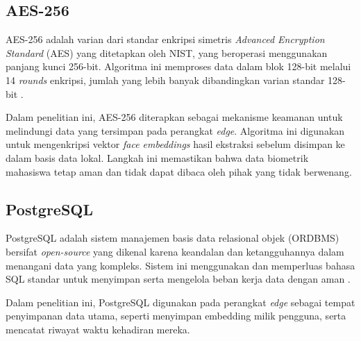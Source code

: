 \subsection{AES-256}
\label{subsec:aes256-teori}

AES-256 adalah varian dari standar enkripsi simetris \textit{Advanced Encryption Standard} (AES) yang ditetapkan oleh NIST, yang beroperasi menggunakan panjang kunci 256-bit. Algoritma ini memproses data dalam blok 128-bit melalui 14 \textit{rounds} enkripsi, jumlah yang lebih banyak dibandingkan varian standar 128-bit \parencite{Gonzalez2023}.

Dalam penelitian ini, AES-256 diterapkan sebagai mekanisme keamanan untuk melindungi data yang tersimpan pada perangkat \textit{edge}. Algoritma ini digunakan untuk mengenkripsi vektor \textit{face embeddings} hasil ekstraksi sebelum disimpan ke dalam basis data lokal. Langkah ini memastikan bahwa data biometrik mahasiswa tetap aman dan tidak dapat dibaca oleh pihak yang tidak berwenang.

\subsection{PostgreSQL}
\label{subsec:postgresql-teori}

PostgreSQL adalah sistem manajemen basis data relasional objek (ORDBMS) bersifat \textit{open-source} yang dikenal karena keandalan dan ketangguhannya dalam menangani data yang kompleks. Sistem ini menggunakan dan memperluas bahasa SQL standar untuk menyimpan serta mengelola beban kerja data dengan aman \parencite{PostgreSQLAbout}.

Dalam penelitian ini, PostgreSQL digunakan pada perangkat \textit{edge} sebagai tempat penyimpanan data utama, seperti menyimpan embedding milik pengguna, serta mencatat riwayat waktu kehadiran mereka.
